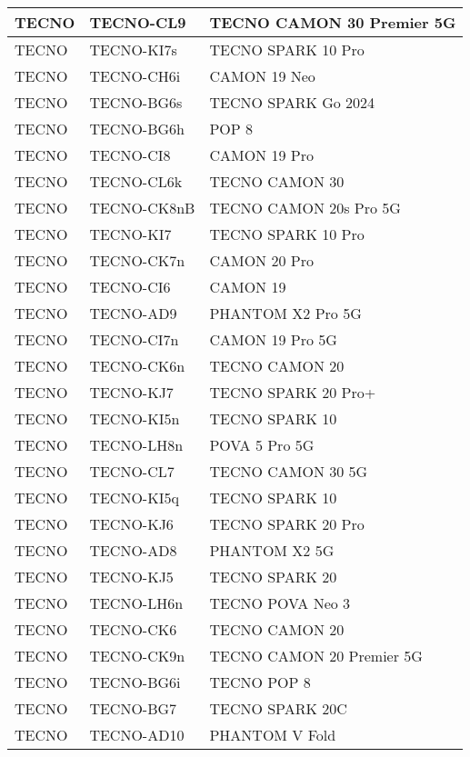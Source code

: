 \begin{tabularx}{\linewidth}{|l|X|X|}
        TECNO & TECNO-CL9 & TECNO CAMON 30 Premier 5G \\ \hline
        TECNO & TECNO-KI7s & TECNO SPARK 10 Pro \\ \hline
        TECNO & TECNO-CH6i & CAMON 19 Neo \\ \hline
        TECNO & TECNO-BG6s & TECNO SPARK Go 2024 \\ \hline
        TECNO & TECNO-BG6h & POP 8 \\ \hline
        TECNO & TECNO-CI8 & CAMON 19 Pro \\ \hline
        TECNO & TECNO-CL6k & TECNO CAMON 30 \\ \hline
        TECNO & TECNO-CK8nB & TECNO CAMON 20s Pro 5G \\ \hline
        TECNO & TECNO-KI7 & TECNO SPARK 10 Pro \\ \hline
        TECNO & TECNO-CK7n & CAMON 20 Pro \\ \hline
        TECNO & TECNO-CI6 & CAMON 19 \\ \hline
        TECNO & TECNO-AD9 & PHANTOM X2 Pro 5G \\ \hline
        TECNO & TECNO-CI7n & CAMON 19 Pro 5G \\ \hline
        TECNO & TECNO-CK6n & TECNO CAMON 20 \\ \hline
        TECNO & TECNO-KJ7 & TECNO SPARK 20 Pro+ \\ \hline
        TECNO & TECNO-KI5n & TECNO SPARK 10 \\ \hline
        TECNO & TECNO-LH8n & POVA 5 Pro 5G \\ \hline
        TECNO & TECNO-CL7 & TECNO CAMON 30 5G \\ \hline
        TECNO & TECNO-KI5q & TECNO SPARK 10 \\ \hline
        TECNO & TECNO-KJ6 & TECNO SPARK 20 Pro \\ \hline
        TECNO & TECNO-AD8 & PHANTOM X2 5G \\ \hline
        TECNO & TECNO-KJ5 & TECNO SPARK 20 \\ \hline
        TECNO & TECNO-LH6n & TECNO POVA Neo 3 \\ \hline
        TECNO & TECNO-CK6 & TECNO CAMON 20 \\ \hline
        TECNO & TECNO-CK9n & TECNO CAMON 20 Premier 5G \\ \hline
        TECNO & TECNO-BG6i & TECNO POP 8 \\ \hline
        TECNO & TECNO-BG7 & TECNO SPARK 20C \\ \hline
        TECNO & TECNO-AD10 & PHANTOM V Fold \\ \hline

\end{tabularx}
